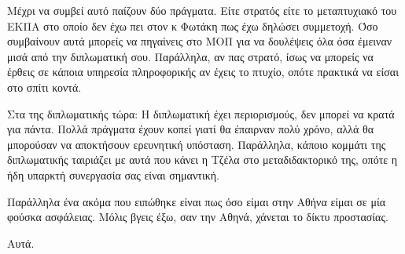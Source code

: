 \documentclass[a4paper,twoside,10pt]{article}
\begin{document}
Μέχρι να συμβεί αυτό παίζουν  δύο πράγματα. Είτε στρατός είτε το μεταπτυχιακό του ΕΚΠΑ στο οποίο δεν έχω πει στον κ Φωτάκη πως έχω δηλώσει συμμετοχή. Όσο συμβαίνουν αυτά μπορείς να πηγαίνεις στο ΜΟΠ για να δουλέψεις όλα όσα έμειναν μισά από την διπλωματική σου. Παράλληλα, αν πας στρατό, ίσως να μπορείς να έρθεις σε κάποια υπηρεσία πληροφορικής αν έχεις το πτυχίο, οπότε πρακτικά να είσαι στο σπίτι κοντά. 

Στα της διπλωματικής τώρα: Η διπλωματική έχει περιορισμούς, δεν μπορεί να κρατά για πάντα. Πολλά πράγματα έχουν κοπεί γιατί θα έπαιρναν πολύ χρόνο, αλλά θα μπορούσαν να αποκτήσουν ερευνητική υπόσταση. Παράλληλα, κάποιο κομμάτι της διπλωματικής ταιριάζει με αυτά που κάνει η Τζέλα στο μεταδιδακτορικό της, οπότε η ήδη υπαρκτή συνεργασία σας είναι σημαντική. 

Παράλληλα ένα ακόμα που ειπώθηκε είναι πως όσο είμαι στην Αθήνα είμαι σε μία φούσκα ασφάλειας. Μόλις βγεις έξω, σαν την Αθηνά, χάνεται το δίκτυ προστασίας. 

Αυτά. 
\end{document}
